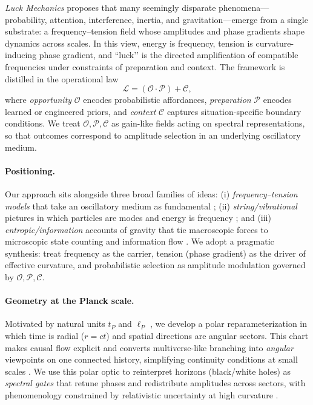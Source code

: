 \documentclass[12pt]{article}
\newcommand{\Luck}{\mathcal{L}}
\newcommand{\Opp}{\mathcal{O}}
\newcommand{\Prep}{\mathcal{P}}
\newcommand{\Circ}{\mathcal{C}}
\theoremstyle{plain}
\theoremstyle{definition}
\begin{document}
\emph{Luck Mechanics} proposes that many seemingly disparate phenomena—probability, attention, interference, inertia, and gravitation—emerge from a single substrate: a frequency–tension field whose amplitudes and phase gradients shape dynamics across scales. In this view, energy is frequency, tension is curvature-inducing phase gradient, and “luck’’ is the directed amplification of compatible frequencies under constraints of preparation and context. The framework is distilled in the operational law
\[
\Luck = (\Opp \cdot \Prep) + \Circ,
\]
where \emph{opportunity} $\Opp$ encodes probabilistic affordances, \emph{preparation} $\Prep$ encodes learned or engineered priors, and \emph{context} $\Circ$ captures situation-specific boundary conditions. We treat $\Opp,\Prep,\Circ$ as gain-like fields acting on spectral representations, so that outcomes correspond to amplitude selection in an underlying oscillatory medium.

\paragraph{Positioning.}
Our approach sits alongside three broad families of ideas: (i) \emph{frequency–tension models} that take an oscillatory medium as fundamental \citep{STheory}; (ii) \emph{string/vibrational} pictures in which particles are modes and energy is frequency \citep{Backreaction}; and (iii) \emph{entropic/information} accounts of gravity that tie macroscopic forces to microscopic state counting and information flow \citep{EntropicGravity}. We adopt a pragmatic synthesis: treat frequency as the carrier, tension (phase gradient) as the driver of effective curvature, and probabilistic selection as amplitude modulation governed by $\Opp,\Prep,\Circ$.

\paragraph{Geometry at the Planck scale.}
Motivated by natural units $t_P$ and $\ell_P$ \citep{PlanckUnits}, we develop a polar reparameterization in which time is radial ($r=ct$) and spatial directions are angular sectors. This chart makes causal flow explicit and converts multiverse-like branching into \emph{angular} viewpoints on one connected history, simplifying continuity conditions at small scales \citep{PolarCoords}. We use this polar optic to reinterpret horizons (black/white holes) as \emph{spectral gates} that retune phases and redistribute amplitudes across sectors, with phenomenology constrained by relativistic uncertainty at high curvature \citep{PhysRevResearch033343}.
\end{document}
